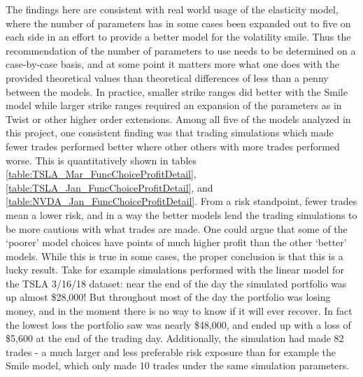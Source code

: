 \documentclass[12pt, a4paper, notitlepage]{article}
\numberwithin{equation}{subsection}
\numberwithin{figure}{subsection}
\numberwithin{table}{subsection}
\newcommand{\newpar}{\newline \newline}
\begin{document}
\newpar
The findings here are consistent with real world usage of the elasticity model, where the number of parameters has in some cases been expanded out to five on each side in an effort to provide a better model for the volatility smile.  Thus the recommendation of the number of parameters to use needs to be determined on a case-by-case basis, and at some point it matters more what one does with the provided theoretical values than theoretical differences of less than a penny between the models.  In practice, smaller strike ranges did better with the Smile model while larger strike ranges required an expansion of the parameters as in Twist or other higher order extensions.
\newpar
Among all five of the models analyzed in this project, one consistent finding was that trading simulations which made fewer trades performed better where other others with more trades performed worse.  This is quantitatively shown in tables \ref{table:TSLA_Mar_FuncChoiceProfitDetail}, \ref{table:TSLA_Jan_FuncChoiceProfitDetail}, and \ref{table:NVDA_Jan_FuncChoiceProfitDetail}.  From a risk standpoint, fewer trades mean a lower risk, and in a way the better models lend the trading simulations to be more cautious with what trades are made.
\newpar
One could argue that some of the `poorer' model choices have points of much higher profit than the other `better' models.  While this is true in some cases, the proper conclusion is that this is a lucky result.  Take for example simulations performed with the linear model for the TSLA 3/16/18 dataset: near the end of the day the simulated portfolio was up almost \$28,000!  But throughout most of the day the portfolio was losing money, and in the moment there is no way to know if it will ever recover.  In fact the lowest loss the portfolio saw was nearly \$48,000, and ended up with a loss of \$5,600 at the end of the trading day.  Additionally, the simulation had made 82 trades - a much larger and less preferable risk exposure than for example the Smile model, which only made 10 trades under the same simulation parameters.
\end{document}
